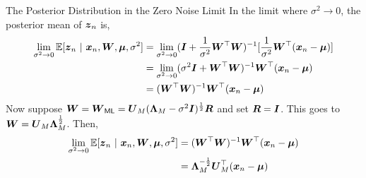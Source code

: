\documentclass[aspectratio=169]{beamer}
\begin{document}
\begin{frame}[t]{The Posterior Distribution in the Zero Noise Limit}
    In the limit where $\sigma^2 \to 0$, the posterior mean of $\boldsymbol{z}_n$ is,
    \begin{align}
        \lim_{\sigma^2 \to 0} \mathbb{E}[\boldsymbol{z}_n ~\vert~ \boldsymbol{x}_n, \boldsymbol{W}, \boldsymbol{\mu}, \sigma^2] 
        &= \lim_{\sigma^2 \to 0} (\boldsymbol{I} + \frac{1}{\sigma^2} \boldsymbol{W}^\top \boldsymbol{W})^{-1} [\frac{1}{\sigma^2} \boldsymbol{W}^\top (\boldsymbol{x}_n - \boldsymbol{\mu})] \\
        &= \lim_{\sigma^2 \to 0} (\sigma^2 \boldsymbol{I} + \boldsymbol{W}^\top \boldsymbol{W})^{-1} \boldsymbol{W}^\top (\boldsymbol{x}_n - \boldsymbol{\mu}) \\
        &= (\boldsymbol{W}^\top \boldsymbol{W})^{-1} \boldsymbol{W}^\top (\boldsymbol{x}_n - \boldsymbol{\mu})
    \end{align}
    Now suppose $\boldsymbol{W} = \boldsymbol{W}_{\mathsf{ML}} = \boldsymbol{U}_M (\boldsymbol{\Lambda}_M - \sigma^2 \boldsymbol{I})^{\frac{1}{2}} \boldsymbol{R}$ and set $\boldsymbol{R} = \boldsymbol{I}$. This goes to $\boldsymbol{W} = \boldsymbol{U}_M \boldsymbol{\Lambda}_M^{\frac{1}{2}}$. Then, 
    \begin{align}
        \lim_{\sigma^2 \to 0} \mathbb{E}[\boldsymbol{z}_n ~\vert~ \boldsymbol{x}_n, \boldsymbol{W}, \boldsymbol{\mu}, \sigma^2] 
        &= (\boldsymbol{W}^\top \boldsymbol{W})^{-1} \boldsymbol{W}^\top (\boldsymbol{x}_n - \boldsymbol{\mu}) \\
        &= \boldsymbol{\Lambda}_M^{-\frac{1}{2}} \boldsymbol{U}_M^\top (\boldsymbol{x}_n - \boldsymbol{\mu})
    \end{align}
    
\end{frame}

    
    
    
\end{document}
